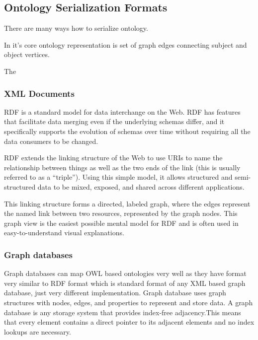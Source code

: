 \subsection{Ontology Serialization Formats}

There are many ways how to serialize ontology.

In it's core ontology representation is set of graph edges connecting subject and object vertices.

The 





\subsubsection{XML Documents}

RDF is a standard model for data interchange on the Web. RDF has features that facilitate data merging even if the underlying schemas differ, and it specifically supports the evolution of schemas over time without requiring all the data consumers to be changed.

RDF extends the linking structure of the Web to use URIs to name the relationship between things as well as the two ends of the link (this is usually referred to as a “triple”). Using this simple model, it allows structured and semi-structured data to be mixed, exposed, and shared across different applications. 

This linking structure forms a directed, labeled graph, where the edges represent the named link between two resources, represented by the graph nodes. This graph view is the easiest possible mental model for RDF and is often used in easy-to-understand visual explanations. 


\subsubsection{Graph databases}

Graph databases can map OWL based ontologies very well as they have format very similar to RDF format which is standard format of any XML based graph database, just very different implementation. Graph database uses graph structures with nodes, edges, and properties to represent and store data. A graph database is any storage system that provides index-free adjacency.This means that every element contains a direct pointer to its adjacent elements and no index lookups are necessary.

